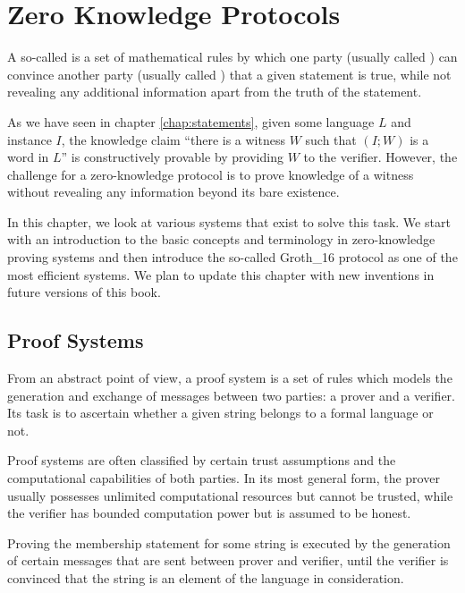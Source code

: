 \chapter{Zero Knowledge Protocols}
A so-called  is a set of mathematical rules by which one party (usually called ) can convince another party (usually called ) that a given statement is true, while not revealing any additional information apart from the truth of the statement. 

As we have seen in chapter \ref{chap:statements}, given some language $L$ and instance $I$, the knowledge claim ``there is a witness $W$ such that  $(I;W)$ is a word in $L$'' is constructively provable by providing $W$ to the verifier. However, the challenge for a zero-knowledge protocol is to prove knowledge of a witness without revealing any information beyond its bare existence.

In this chapter, we look at various systems that exist to solve this task. We start with an introduction to the basic concepts and terminology in zero-knowledge proving systems and then introduce the so-called Groth\_16 protocol as one of the most efficient systems. We plan to update this chapter with new inventions in future versions of this book.

\section{Proof Systems}
From an abstract point of view, a proof system is a set of rules which models the generation and exchange of messages between two parties: a prover and a verifier. Its task is to ascertain whether a given string belongs to a formal language or not.  

Proof systems are often classified by certain trust assumptions and the computational capabilities of both parties. In its most general form, the prover usually possesses unlimited computational resources but cannot be trusted, while the verifier has bounded computation power but is assumed to be honest.

Proving the membership statement for some string is executed by the generation of certain messages that are sent between prover and verifier, until the verifier is convinced that the string is an element of the language in consideration.

